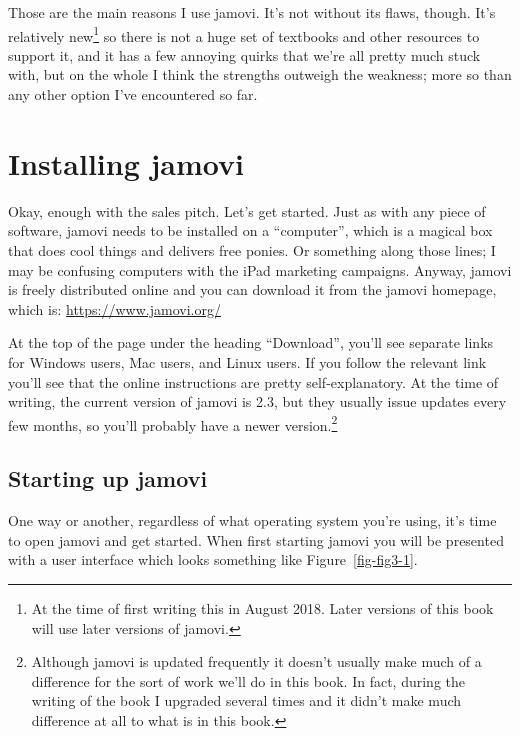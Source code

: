 \documentclass[
  a4paper,
]{book}
\begin{document}
Those are the main reasons I use jamovi. It's not without its flaws,
though. It's relatively new\footnote{At the time of first writing this
  in August 2018. Later versions of this book will use later versions of
  jamovi.} so there is not a huge set of textbooks and other resources
to support it, and it has a few annoying quirks that we're all pretty
much stuck with, but on the whole I think the strengths outweigh the
weakness; more so than any other option I've encountered so far.

\hypertarget{installing-jamovi}{%
\section{Installing jamovi}\label{installing-jamovi}}

Okay, enough with the sales pitch. Let's get started. Just as with any
piece of software, jamovi needs to be installed on a ``computer'', which
is a magical box that does cool things and delivers free ponies. Or
something along those lines; I may be confusing computers with the iPad
marketing campaigns. Anyway, jamovi is freely distributed online and you
can download it from the jamovi homepage, which is:
\url{https://www.jamovi.org/}

At the top of the page under the heading ``Download'', you'll see
separate links for Windows users, Mac users, and Linux users. If you
follow the relevant link you'll see that the online instructions are
pretty self-explanatory. At the time of writing, the current version of
jamovi is 2.3, but they usually issue updates every few months, so
you'll probably have a newer version.\footnote{Although jamovi is
  updated frequently it doesn't usually make much of a difference for
  the sort of work we'll do in this book. In fact, during the writing of
  the book I upgraded several times and it didn't make much difference
  at all to what is in this book.}

\hypertarget{starting-up-jamovi}{%
\subsection{Starting up jamovi}\label{starting-up-jamovi}}

One way or another, regardless of what operating system you're using,
it's time to open jamovi and get started. When first starting jamovi you
will be presented with a user interface which looks something like
Figure~\ref{fig-fig3-1}.
\end{document}
